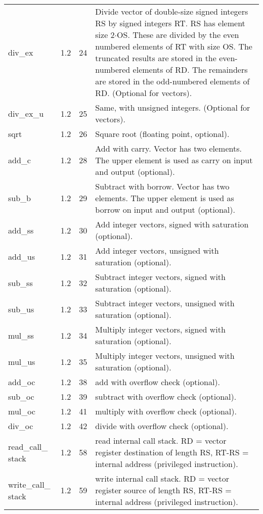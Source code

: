\documentclass[forwardcom.tex]{subfiles}
\begin{document}
\begin{longtable} {|p{25mm}|p{12mm}|p{12mm}|p{95mm}|}
div\_ex    & 1.2 & 24 & Divide vector of double-size signed integers RS by signed integers RT. RS has element size 2$\cdot$OS. These are divided by the even numbered
elements of RT with size OS. The truncated results are stored in
the even-numbered elements of RD. The remainders are stored in
the odd-numbered elements of RD. (Optional for vectors). \\
div\_ex\_u    & 1.2 & 25 & Same, with unsigned integers. (Optional for vectors). \\
sqrt          & 1.2 & 26 & Square root (floating point, optional). \\
add\_c        & 1.2 & 28 & Add with carry. Vector has two elements. The upper element is used as carry on input and output (optional). \\
sub\_b        & 1.2 & 29 & Subtract with borrow. Vector has two elements. The upper element is used as borrow on input and output (optional). \\
add\_ss       & 1.2 & 30 & Add integer vectors, signed with saturation (optional). \\
add\_us       & 1.2 & 31 & Add integer vectors, unsigned with saturation (optional). \\
sub\_ss       & 1.2 & 32 & Subtract integer vectors, signed with saturation (optional). \\
sub\_us       & 1.2 & 33 & Subtract integer vectors, unsigned with saturation (optional). \\
mul\_ss       & 1.2 & 34 & Multiply integer vectors, signed with saturation (optional). \\
mul\_us       & 1.2 & 35 & Multiply integer vectors, unsigned with saturation (optional). \\
add\_oc       & 1.2 & 38 & add with overflow check (optional). \\
sub\_oc       & 1.2 & 39 & subtract with overflow check (optional). \\
mul\_oc       & 1.2 & 41 & multiply with overflow check (optional). \\
div\_oc       & 1.2 & 42 & divide with overflow check (optional). \\

read\_call\_ stack & 1.2 & 58 & read internal call stack. RD = vector register destination of length RS, RT-RS = internal address (privileged instruction). \\
write\_call\_ stack & 1.2 & 59 & write internal call stack. RD = vector register source of length RS, RT-RS = internal address (privileged instruction). \\


\end{longtable}
\end{document}
